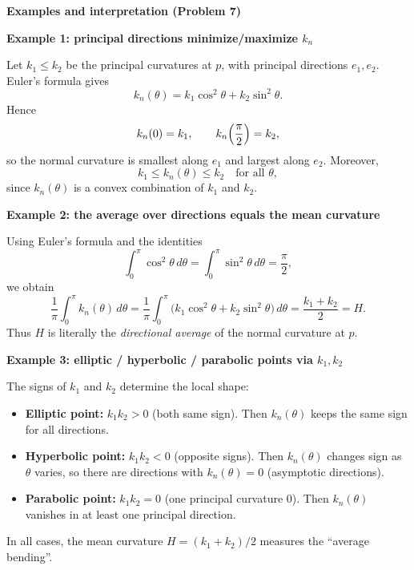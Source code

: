 \begin{solution}
\par\medskip\noindent\textbf{Examples and interpretation (Problem 7)}\par\smallskip


\par\medskip\noindent\textbf{Example 1: principal directions minimize/maximize $k_n$}\par\smallskip

Let $k_1\le k_2$ be the principal curvatures at $p$, with principal directions $e_1,e_2$.
Euler's formula gives
\[
k_n(\theta)=k_1\cos^2\theta+k_2\sin^2\theta.
\]
Hence
\[
k_n(0)=k_1,\qquad k_n\Bigl(\frac{\pi}{2}\Bigr)=k_2,
\]
so the normal curvature is smallest along $e_1$ and largest along $e_2$.
Moreover,
\[
k_1\le k_n(\theta)\le k_2 \quad\text{for all }\theta,
\]
since $k_n(\theta)$ is a convex combination of $k_1$ and $k_2$.

\par\medskip\noindent\textbf{Example 2: the average over directions equals the mean curvature}\par\smallskip

Using Euler's formula and the identities
\[
\int_0^\pi \cos^2\theta\,d\theta=\int_0^\pi \sin^2\theta\,d\theta=\frac{\pi}{2},
\]
we obtain
\[
\frac{1}{\pi}\int_0^\pi k_n(\theta)\,d\theta
=\frac{1}{\pi}\int_0^\pi\bigl(k_1\cos^2\theta+k_2\sin^2\theta\bigr)\,d\theta
=\frac{k_1+k_2}{2}=H.
\]
Thus $H$ is literally the \emph{directional average} of the normal curvature at $p$.

\par\medskip\noindent\textbf{Example 3: elliptic / hyperbolic / parabolic points via $k_1,k_2$}\par\smallskip

The signs of $k_1$ and $k_2$ determine the local shape:
\begin{itemize}
	\item \textbf{Elliptic point:} $k_1k_2>0$ (both same sign). Then $k_n(\theta)$ keeps the same sign for all directions.
	\item \textbf{Hyperbolic point:} $k_1k_2<0$ (opposite signs). Then $k_n(\theta)$ changes sign as $\theta$ varies, so there are directions with $k_n(\theta)=0$ (asymptotic directions).
	\item \textbf{Parabolic point:} $k_1k_2=0$ (one principal curvature $0$). Then $k_n(\theta)$ vanishes in at least one principal direction.
\end{itemize}
In all cases, the mean curvature $H=(k_1+k_2)/2$ measures the ``average bending''.


\end{solution}
